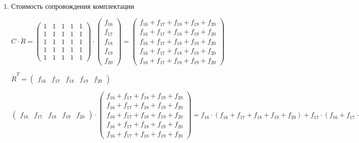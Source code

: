 \begin{enumerate}
  \item Стоимость сопровождения комплектации
  \begin{center}
    $
      C \cdot \dot{R}
      =
      \begin{pmatrix}
        1 & 1 & 1 & 1 & 1   \\
        1 & 1 & 1 & 1 & 1   \\
        1 & 1 & 1 & 1 & 1   \\
        1 & 1 & 1 & 1 & 1   \\
        1 & 1 & 1 & 1 & 1 
      \end{pmatrix}
      \cdot
      \begin{pmatrix}
        f_{16} \\ 
        f_{17} \\
        f_{18} \\
        f_{19} \\
        f_{20}
      \end{pmatrix}
      =
      \begin{pmatrix}
        f_{16} + f_{17} + f_{18} + f_{19} + f_{20} \\ 
        f_{16} + f_{17} + f_{18} + f_{19} + f_{20} \\
        f_{16} + f_{17} + f_{18} + f_{19} + f_{20} \\
        f_{16} + f_{17} + f_{18} + f_{19} + f_{20} \\
        f_{16} + f_{17} + f_{18} + f_{19} + f_{20}
      \end{pmatrix}
    $
  \end{center}
  \begin{center}
    $
      \dot{R}^{T} = 
      \begin{pmatrix}
        f_{16} & f_{17} & f_{18} & f_{19} & f_{20}
      \end{pmatrix}
    $
  \end{center}
  \begin{center}
    $
      \begin{pmatrix}
        f_{16} & f_{17} & f_{18} & f_{19} & f_{20}
      \end{pmatrix}
      \cdot
      \begin{pmatrix}
        f_{16} + f_{17} + f_{18} + f_{19} + f_{20} \\ 
        f_{16} + f_{17} + f_{18} + f_{19} + f_{20} \\
        f_{16} + f_{17} + f_{18} + f_{19} + f_{20} \\
        f_{16} + f_{17} + f_{18} + f_{19} + f_{20} \\
        f_{16} + f_{17} + f_{18} + f_{19} + f_{20}
      \end{pmatrix}
      = 
      f_{16} \cdot (f_{16} + f_{17} + f_{18} + f_{19} + f_{20}) + f_{17} \cdot (f_{16} + f_{17} + f_{18} + f_{19} + f_{20}) + f_{18} \cdot (f_{16} + f_{17} + f_{18} + f_{19} + f_{20}) + f_{19} \cdot (f_{16} + f_{17} + f_{18} + f_{19} + f_{20}) + f_{20} \cdot (f_{16} + f_{17} + f_{18} + f_{19} + f_{20})
    $
  \end{center}


\end{enumerate}
